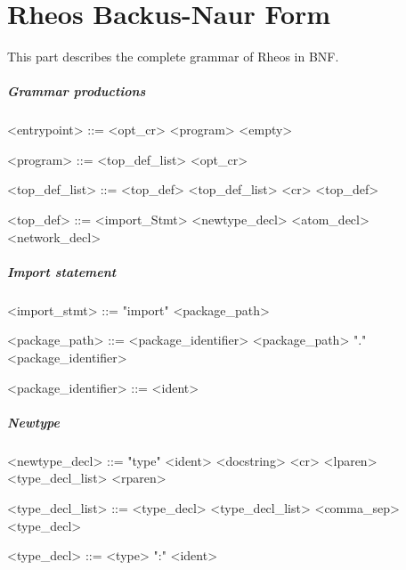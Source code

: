\chapter{Rheos Backus-Naur Form}\label{ch:bnf}
This part describes the complete grammar of Rheos in BNF.



\paragraph{Grammar productions}

\begin{grammar}
  <entrypoint> ::= <opt_cr> <program>
  \alt <empty>

  <program> ::= <top_def_list> <opt_cr>

  <top_def_list> ::= <top_def>
  \alt <top_def_list> <cr> <top_def>

  <top_def> ::= <import_Stmt>
  \alt <newtype_decl>
  \alt <atom_decl>
  \alt <network_decl>
\end{grammar}


\paragraph{Import statement}

\begin{grammar}
  <import_stmt> ::= "import" <package_path>

  <package_path> ::= <package_identifier>
  \alt <package_path> "." <package_identifier>

  <package_identifier> ::= <ident>
\end{grammar}


\paragraph{Newtype}

\begin{grammar}
  <newtype_decl> ::= "type" <ident> <docstring> <cr> <lparen>
  <type_decl_list> <rparen>

  <type_decl_list> ::= <type_decl>
  \alt <type_decl_list> <comma_sep> <type_decl>

  <type_decl> ::= <type> ":" <ident>
\end{grammar}


